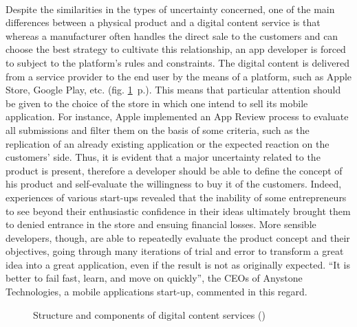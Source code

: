 \documentclass[twoside]{report}
\begin{document}
\paragraph{}
Despite the similarities in the types of uncertainty concerned, one of the main differences between a physical product and a digital content service is that whereas a manufacturer often handles the direct sale to the customers and can choose the best strategy to cultivate this relationship, an app developer is forced to subject to the platform's rules and constraints. The digital content is delivered from a service provider to the end user by the means of a platform, such as Apple Store, Google Play, etc. (fig. \ref{fig:content_service}~p.\pageref{fig:content_service}). This means that particular attention should be given to the choice of the store in which one intend to sell its mobile application. For instance, Apple implemented an App Review process to evaluate all submissions and filter them on the basis of some criteria, such as the replication of an already existing application or the expected reaction on the customers' side. Thus, it is evident that a major uncertainty related to the product is present, therefore a developer should be able to define the concept of his product and self-evaluate the willingness to buy it of the customers. Indeed, experiences of various start-ups revealed that the inability of some entrepreneurs to see beyond their enthusiastic confidence in their ideas ultimately brought them to denied entrance in the store and ensuing financial losses. More sensible developers, though, are able to repeatedly evaluate the product concept and their objectives, going through many iterations of trial and error to transform a great idea into a great application, even if the result is not as originally expected. \enquote{It is better to fail fast, learn, and move on quickly}, the CEOs of Anystone Technologies, a mobile applications start-up, commented in this regard.
\begin{figure}
\begin{center}

\caption{Structure and components of digital content services (\cite{kim_patterns_2012})}
\label{fig:content_service}
\end{center}
\end{figure}
\end{document}

